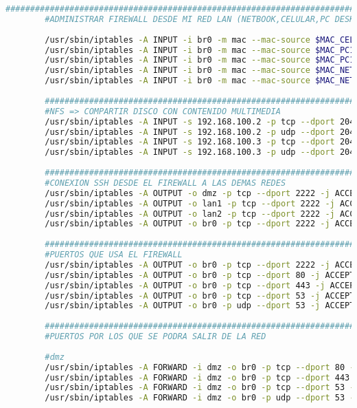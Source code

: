 \begin{lstlisting}[language=Bash, caption=iptables]
		########################################################################################
		#ADMINISTRAR FIREWALL DESDE MI RED LAN (NETBOOK,CELULAR,PC DESKTOP)
		
		/usr/sbin/iptables -A INPUT -i br0 -m mac --mac-source $MAC_CEL -p tcp --dport 2222 -j ACCEPT #CELULAR
		/usr/sbin/iptables -A INPUT -i br0 -m mac --mac-source $MAC_PC1 -p tcp --dport 2222 -j ACCEPT #MI PC
		/usr/sbin/iptables -A INPUT -i br0 -m mac --mac-source $MAC_PC1 -p tcp --dport 5900:5920 -j ACCEPT #SPICE
		/usr/sbin/iptables -A INPUT -i br0 -m mac --mac-source $MAC_NET -p tcp --dport 2222 -j ACCEPT #NET
		/usr/sbin/iptables -A INPUT -i br0 -m mac --mac-source $MAC_NET -p tcp --dport 5900:5920 -j ACCEPT #SPICE
		
		########################################################################################
		#NFS => COMPARTIR DISCO CON CONTENIDO MULTIMEDIA
		/usr/sbin/iptables -A INPUT -s 192.168.100.2 -p tcp --dport 2049 -j ACCEPT #NFS
		/usr/sbin/iptables -A INPUT -s 192.168.100.2 -p udp --dport 2049 -j ACCEPT #NFS
		/usr/sbin/iptables -A INPUT -s 192.168.100.3 -p tcp --dport 2049 -j ACCEPT #NFS
		/usr/sbin/iptables -A INPUT -s 192.168.100.3 -p udp --dport 2049 -j ACCEPT #NFS
		
		########################################################################################
		#CONEXION SSH DESDE EL FIREWALL A LAS DEMAS REDES
		/usr/sbin/iptables -A OUTPUT -o dmz -p tcp --dport 2222 -j ACCEPT #SSH
		/usr/sbin/iptables -A OUTPUT -o lan1 -p tcp --dport 2222 -j ACCEPT #SSH
		/usr/sbin/iptables -A OUTPUT -o lan2 -p tcp --dport 2222 -j ACCEPT #SSH
		/usr/sbin/iptables -A OUTPUT -o br0 -p tcp --dport 2222 -j ACCEPT #SSH
		
		########################################################################################
		#PUERTOS QUE USA EL FIREWALL
		/usr/sbin/iptables -A OUTPUT -o br0 -p tcp --dport 2222 -j ACCEPT #SSH
		/usr/sbin/iptables -A OUTPUT -o br0 -p tcp --dport 80 -j ACCEPT #HTTP
		/usr/sbin/iptables -A OUTPUT -o br0 -p tcp --dport 443 -j ACCEPT #HTTPS
		/usr/sbin/iptables -A OUTPUT -o br0 -p tcp --dport 53 -j ACCEPT #DNS TCP
		/usr/sbin/iptables -A OUTPUT -o br0 -p udp --dport 53 -j ACCEPT #DNS UDP
		
		########################################################################################
		#PUERTOS POR LOS QUE SE PODRA SALIR DE LA RED
		
		#dmz
		/usr/sbin/iptables -A FORWARD -i dmz -o br0 -p tcp --dport 80 -j ACCEPT
		/usr/sbin/iptables -A FORWARD -i dmz -o br0 -p tcp --dport 443 -j ACCEPT
		/usr/sbin/iptables -A FORWARD -i dmz -o br0 -p tcp --dport 53 -j ACCEPT
		/usr/sbin/iptables -A FORWARD -i dmz -o br0 -p udp --dport 53 -j ACCEPT
		

\end{lstlisting}
